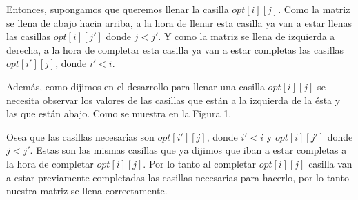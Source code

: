 Entonces, supongamos que queremos llenar la casilla $opt[i][j]$. Como la matriz se llena de abajo hacia arriba, a la hora de llenar esta casilla ya van a estar llenas las casillas $opt[i][j']$ donde $j < j'$. Y como la matriz se llena de izquierda a derecha, a la hora de completar esta casilla ya van a estar completas las casillas $opt[i'][j]$, donde $i' < i$.

Además, como dijimos en el desarrollo para llenar una casilla $opt[i][j]$ se necesita observar los valores de las casillas que están a la izquierda de la ésta y las que están abajo. Como se muestra en la Figura 1.

Osea que las casillas necesarias son $opt[i'][j]$, donde $i' < i$ y $opt[i][j']$ donde $j < j'$. Estas son las mismas casillas que ya dijimos que iban a estar completas a la hora de completar $opt[i][j]$. Por lo tanto al completar $opt[i][j]$ casilla van a estar previamente completadas las casillas necesarias para hacerlo, por lo tanto nuestra matriz se llena correctamente.
